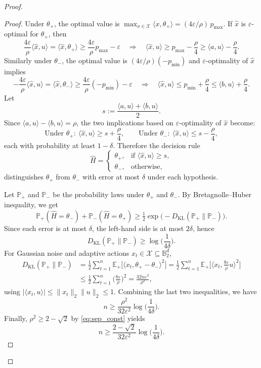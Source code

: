 \begin{proof}
\begin{proof}
\noindent
Under $\theta_+$, the optimal value is $\max_{x\in\mathcal X}\langle x,\theta_+\rangle=(4\varepsilon/\rho)\,p_{\max}$.
If $\widehat x$ is $\varepsilon$-optimal for $\theta_+$, then
\[
\frac{4\varepsilon}{\rho}\langle \widehat x,u\rangle
=\langle \widehat x,\theta_+\rangle
\ge \frac{4\varepsilon}{\rho}p_{\max}-\varepsilon
\quad\Rightarrow\quad
\langle \widehat x,u\rangle \ge p_{\max}-\frac{\rho}{4}
\ge \langle a,u\rangle-\frac{\rho}{4}.
\]
Similarly under $\theta_-$, the optimal value is $(4\varepsilon/\rho)(-p_{\min})$ and $\varepsilon$-optimality of $\widehat x$ implies
\[
-\frac{4\varepsilon}{\rho}\langle \widehat x,u\rangle
=\langle \widehat x,\theta_-\rangle
\ge \frac{4\varepsilon}{\rho}(-p_{\min})-\varepsilon
\quad\Rightarrow\quad
\langle \widehat x,u\rangle \le p_{\min}+\frac{\rho}{4}
\le \langle b,u\rangle+\frac{\rho}{4}.
\]
Let
\[
s := \frac{\langle a,u\rangle+\langle b,u\rangle}{2}.
\]
Since $\langle a,u\rangle-\langle b,u\rangle=\rho$, the two implications based on $\varepsilon$-optimality of $\widehat x$ become:
\[
\text{Under }\theta_+:\ \langle \widehat x,u\rangle \ge s+\frac{\rho}{4},
\qquad
\text{Under }\theta_-:\ \langle \widehat x,u\rangle \le s-\frac{\rho}{4},
\]
each with probability at least $1-\delta$.
Therefore the decision rule
\[
\widehat H=
\begin{cases}
\theta_+, & \text{if }\langle \widehat x,u\rangle \ge s,\\
\theta_-, & \text{otherwise},
\end{cases}
\]
distinguishes $\theta_+$ from $\theta_-$ with error at most $\delta$ under each hypothesis.

\noindent
Let $\mathbb P_+$ and $\mathbb P_-$ be the probability laws under $\theta_+$ and $\theta_-$.
By Bretagnolle--Huber inequality, we get
\[
\mathbb P_+(\widehat H=\theta_-)+\mathbb P_-(\widehat H=\theta_+)
\ge \tfrac12 \exp\!\big(-D_{\mathrm{KL}}(\mathbb P_+\|\mathbb P_-)\big).
\]
Since each error is at most $\delta$, the left-hand side is at most $2\delta$, hence
\[
D_{\mathrm{KL}}(\mathbb P_+\|\mathbb P_-)\ge \log\!\Big(\frac{1}{4\delta}\Big).
\]
For Gaussian noise and adaptive actions $x_t\in\mathcal X\subseteq \mathbb B_2^d$,
\begin{align*}
D_{\mathrm{KL}}(\mathbb P_+\|\mathbb P_-)
&= \frac12\sum_{t=1}^n \mathbb E_+\!\big[\langle x_t,\theta_+-\theta_-\rangle^2\big]
= \frac12\sum_{t=1}^n \mathbb E_+\!\Big[\Big\langle x_t,\frac{8\varepsilon}{\rho}u\Big\rangle^2\Big] \\
&\le \frac12\sum_{t=1}^n \Big(\frac{8\varepsilon}{\rho}\Big)^2
= \frac{32n\varepsilon^2}{\rho^2},
\end{align*}
using $|\langle x_t,u\rangle|\le \|x_t\|_2\|u\|_2\le 1$.
Combining the last two inequalities, we have
\[
n \ge \frac{\rho^2}{32\varepsilon^2}\log\!\Big(\frac{1}{4\delta}\Big).
\]
Finally, $\rho^2\ge 2-\sqrt2$ by \eqref{eq:sep_const} yields
\[
n \ge \frac{2-\sqrt2}{32\varepsilon^2}\log\!\Big(\frac{1}{4\delta}\Big).
\]
\end{proof}





\end{proof}
